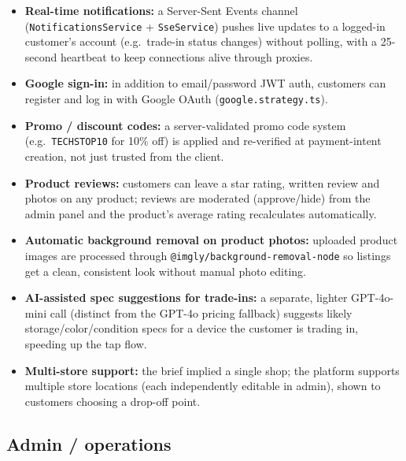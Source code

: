 \documentclass[11pt,a4paper]{article}
\begin{document}
\begin{itemize}
  \item \textbf{Real-time notifications:} a Server-Sent Events channel (\texttt{NotificationsService} + \texttt{SseService}) pushes live updates to a logged-in customer's account (e.g.\ trade-in status changes) without polling, with a 25-second heartbeat to keep connections alive through proxies.
  \item \textbf{Google sign-in:} in addition to email/password JWT auth, customers can register and log in with Google OAuth (\texttt{google.strategy.ts}).
  \item \textbf{Promo / discount codes:} a server-validated promo code system (e.g.\ \texttt{TECHSTOP10} for 10\% off) is applied and re-verified at payment-intent creation, not just trusted from the client.
  \item \textbf{Product reviews:} customers can leave a star rating, written review and photos on any product; reviews are moderated (approve/hide) from the admin panel and the product's average rating recalculates automatically.
  \item \textbf{Automatic background removal on product photos:} uploaded product images are processed through \texttt{@imgly/background-removal-node} so listings get a clean, consistent look without manual photo editing.
  \item \textbf{AI-assisted spec suggestions for trade-ins:} a separate, lighter GPT-4o-mini call (distinct from the GPT-4o pricing fallback) suggests likely storage/color/condition specs for a device the customer is trading in, speeding up the tap flow.
  \item \textbf{Multi-store support:} the brief implied a single shop; the platform supports multiple store locations (each independently editable in admin), shown to customers choosing a drop-off point.
\end{itemize}

\subsection{Admin / operations}
\end{document}
